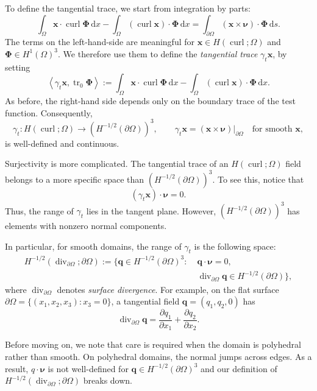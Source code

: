 \documentclass[11pt,a4paper]{article}
\newcommand{\Om}{\Omega}
\newcommand{\dd}{\,\mathrm{d}}
\newcommand{\tr}{\operatorname{tr}}
\newcommand{\Div}{\operatorname{div}}
\newcommand{\Curl}{\operatorname{curl}}
\newcommand{\Hcurl}{H(\Curl;\Om)}
\newcommand{\dual}[2]{\left\langle #1,#2\right\rangle}
\begin{document}
To define the tangential trace, we start from integration by parts:
\begin{equation}\label{eq:curl-green}
    \int_\Om \mathbf x\cdot\Curl\boldsymbol\Phi\dd x
    -\int_\Om (\Curl\mathbf x)\cdot\boldsymbol\Phi\dd x
    =\int_{\partial\Om}
        (\mathbf x\times\boldsymbol\nu)\cdot\boldsymbol\Phi\dd s.
\end{equation}
The terms on the left-hand-side are meaningful for $\mathbf x\in\Hcurl$ and
$\boldsymbol\Phi\in H^1(\Om)^3$. We therefore use them to define the
\emph{tangential trace} $\gamma_t\mathbf x$, by setting
\begin{equation}\label{eq:hcurl-trace}
    \dual{\gamma_t\mathbf x}{\tr_0\boldsymbol\Phi}
    :=\int_\Om\mathbf x\cdot\Curl\boldsymbol\Phi\dd x
      -\int_\Om(\Curl\mathbf x)\cdot\boldsymbol\Phi\dd x.
\end{equation}
As before, the right-hand side depends only on the boundary trace of the
test function. Consequently,
\[
    \gamma_t:\Hcurl\longrightarrow (H^{-1/2}(\partial\Om))^3,
    \qquad \gamma_t\mathbf x=(\mathbf x\times\boldsymbol\nu)|_{\partial \Om}
       \quad\text{for smooth }\mathbf x,
\]
is well-defined and continuous.

Surjectivity is more complicated. The tangential trace of an $H(\Curl; \Om)$
field belongs to a more specific space than $(H^{-1/2}(\partial\Om))^3$.
To see this, notice that
\[
    (\gamma_t\mathbf x)\cdot\boldsymbol\nu=0.
\]
Thus, the range of $\gamma_t$ lies in the tangent plane. However, $(H^{-1/2}(\partial\Om))^3$ has elements with nonzero normal components. 


In particular, for smooth domains, the range of $\gamma_t$ is the following space:
\[
\begin{split}
    H^{-1/2}(\Div_{\partial \Om};\partial \Om)
    :=\bigl\{\mathbf q\in H^{-1/2}(\partial \Om)^3:\;&
      \mathbf q\cdot\boldsymbol\nu=0,\\[-0.2em]
     &\Div_{\partial \Om} \mathbf q\in H^{-1/2}(\partial \Om)\bigr\},
\end{split}
\]
where $\Div_{\partial \Om}$ denotes \emph{surface divergence}. For example, on the
flat surface $\partial \Om =\{(x_1,x_2,x_3):x_3=0\}$, a tangential field
$\mathbf q=(q_1,q_2,0)$ has
\[
    \Div_{\partial \Om} \mathbf q
     =\frac{\partial q_1}{\partial x_1}
      +\frac{\partial q_2}{\partial x_2}.
\]

Before moving on, we note that care is required when the domain is polyhedral rather than smooth.
On polyhedral domains, the normal jumps across edges. As a result, $q\cdot\boldsymbol\nu$ is not well-defined for $\mathbf q\in H^{-1/2}(\partial \Om)^3$ and our definition of $H^{-1/2}(\Div_{\partial \Om};\partial \Om)$ breaks down.
\end{document}
